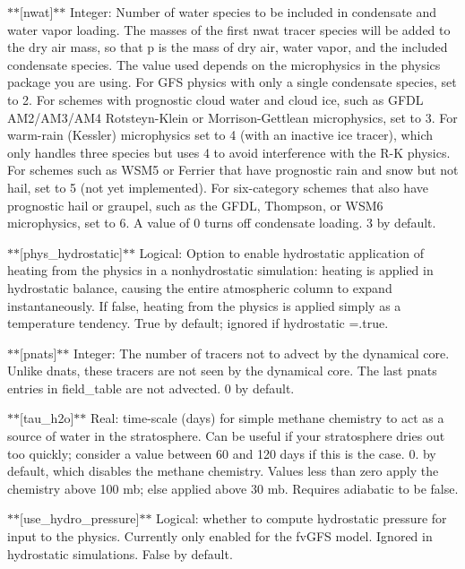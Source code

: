 $\ast$$\ast$\mbox{[}nwat\mbox{]}$\ast$$\ast$ Integer\-: Number of water species to be included in condensate and water vapor loading. The masses of the first nwat tracer species will be added to the dry air mass, so that {\ttfamily p} is the mass of dry air, water vapor, and the included condensate species. The value used depends on the microphysics in the physics package you are using. For G\-F\-S physics with only a single condensate species, set to 2. For schemes with prognostic cloud water and cloud ice, such as G\-F\-D\-L A\-M2/\-A\-M3/\-A\-M4 Rotsteyn-\/\-Klein or Morrison-\/\-Gettlean microphysics, set to 3. For warm-\/rain (Kessler) microphysics set to 4 (with an inactive ice tracer), which only handles three species but uses 4 to avoid interference with the R-\/\-K physics. For schemes such as W\-S\-M5 or Ferrier that have prognostic rain and snow but not hail, set to 5 (not yet implemented). For six-\/category schemes that also have prognostic hail or graupel, such as the G\-F\-D\-L, Thompson, or W\-S\-M6 microphysics, set to 6. A value of 0 turns off condensate loading. 3 by default.

$\ast$$\ast$\mbox{[}phys\-\_\-hydrostatic\mbox{]}$\ast$$\ast$ Logical\-: Option to enable hydrostatic application of heating from the physics in a nonhydrostatic simulation\-: heating is applied in hydrostatic balance, causing the entire atmospheric column to expand instantaneously. If false, heating from the physics is applied simply as a temperature tendency. True by default; ignored if hydrostatic =.true.

$\ast$$\ast$\mbox{[}pnats\mbox{]}$\ast$$\ast$ Integer\-: The number of tracers not to advect by the dynamical core. Unlike dnats, these tracers are not seen by the dynamical core. The last pnats entries in field\-\_\-table are not advected. 0 by default.

$\ast$$\ast$\mbox{[}tau\-\_\-h2o\mbox{]}$\ast$$\ast$ Real\-: time-\/scale (days) for simple methane chemistry to act as a source of water in the stratosphere. Can be useful if your stratosphere dries out too quickly; consider a value between 60 and 120 days if this is the case. 0. by default, which disables the methane chemistry. Values less than zero apply the chemistry above 100 mb; else applied above 30 mb. Requires adiabatic to be false.

$\ast$$\ast$\mbox{[}use\-\_\-hydro\-\_\-pressure\mbox{]}$\ast$$\ast$ Logical\-: whether to compute hydrostatic pressure for input to the physics. Currently only enabled for the fv\-G\-F\-S model. Ignored in hydrostatic simulations. False by default.

